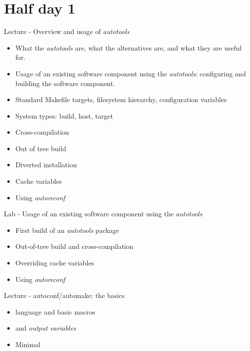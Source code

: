 \documentclass[a4paper,12pt,obeyspaces,spaces,hyphens]{article}
\begin{document}
\feshowtitle

\onlinepedagogics
{}
\certificate{}
\disabilities{}

\section{Half day 1}

\feagendatwocolumn
{Lecture - Overview and usage of {\em autotools}}
{
  \begin{itemize}
  \item What the {\em autotools} are, what the alternatives are, and
    what they are useful for.
  \item Usage of an existing software component using the {\em
      autotools}: configuring and building the software component.
  \item Standard Makefile targets, filesystem hierarchy, configuration variables
  \item System types: build, host, target
  \item Cross-compilation
  \item Out of tree build
  \item Diverted installation
  \item Cache variables
  \item Using {\em autoreconf}
  \end{itemize}
}
{Lab - Usage of an existing software component using the {\em autotools}}
{
  \begin{itemize}
  \item First build of an {\em autotools} package
  \item Out-of-tree build and cross-compilation
  \item Overriding cache variables
  \item Using {\em autoreconf}
  \end{itemize}
}

\feagendaonecolumn
{Lecture - autoconf/automake: the basics}
{
  \begin{itemize}
  \item {} language and basic macros
  \item {} and {\em output variables}
  \item Minimal 
  \end{itemize}
}
\end{document}

